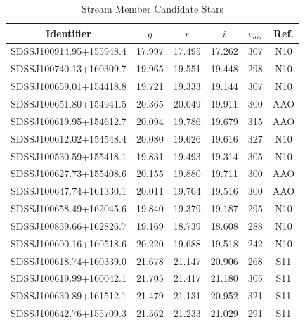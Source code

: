 \documentclass[manuscript]{aastex}
\begin{document}
\begin{table}
 \begin{threeparttable}
  \begin{center}
    \caption{Stream Member Candidate Stars}
    \label{tab:members}
    {\tiny
    \begin{tabular}{c c c c c c}
     \hline \hline

       Identifier                    & $g$     &  $r$    &    $i$    & $v_{hel}$ & Ref.       \\ \hline  
     SDSSJ100914.95+155948.4\tnote{a}     & 17.997   & 17.495   & 17.262     &  307  & N10     \\
     SDSSJ100740.13+160309.7\tnote{b}    & 19.965   & 19.551   & 19.448     &  298	& N10     \\
     SDSSJ100659.01+154418.8         & 19.721   & 19.333   & 19.144     &  307	& N10     \\ 
     SDSSJ100651.80+154941.5         & 20.365   & 20.049   & 19.911     &  300 	& AAO     \\
     SDSSJ100619.95+154612.7         & 20.094   & 19.786   & 19.679     &  315 	& AAO     \\
     SDSSJ100612.02+154548.4         & 20.080   & 19.626   & 19.616     &  327	& N10     \\
     SDSSJ100530.59+155418.1         & 19.831   & 19.493   & 19.314     &  305	& N10     \\
     SDSSJ100627.73+155408.6         & 20.155   & 19.880   & 19.711     &  300	& AAO     \\
     SDSSJ100647.74+161330.1         & 20.011   & 19.704   & 19.516     &  300  & AAO     \\
     SDSSJ100658.49+162045.6         & 19.840   & 19.379   & 19.187     &  295	& N10     \\
     SDSSJ100839.66+162826.7         & 19.169   & 18.739   & 18.608     &  288	& N10     \\   
     SDSSJ100600.16+160518.6         & 20.220	& 19.688   & 19.518	&  242  & N10     \\
     SDSSJ100618.74+160339.0         & 21.678   & 21.147   & 20.906     &  268  & S11     \\
     SDSSJ100619.99+160042.1         & 21.705   & 21.417   & 21.180     &  305	& S11     \\
     SDSSJ100630.89+161512.1         & 21.479   & 21.131   & 20.952     &  321	& S11     \\
     SDSSJ100642.76+155709.3         & 21.562   & 21.233   & 21.029     &  291	& S11     \\

\end{tabular}}
\end{center}
\end{threeparttable}
\end{table}
\end{document}
